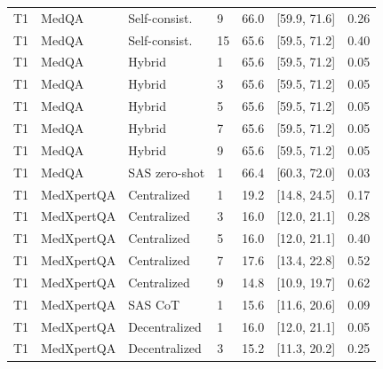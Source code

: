 \begin{table}[t]
\begin{tabular}{@{}llllrrr@{}}
T1 & MedQA & Self-consist. & 9 & 66.0 & [59.9, 71.6] & 0.26 \\
T1 & MedQA & Self-consist. & 15 & 65.6 & [59.5, 71.2] & 0.40 \\
T1 & MedQA & Hybrid & 1 & 65.6 & [59.5, 71.2] & 0.05 \\
T1 & MedQA & Hybrid & 3 & 65.6 & [59.5, 71.2] & 0.05 \\
T1 & MedQA & Hybrid & 5 & 65.6 & [59.5, 71.2] & 0.05 \\
T1 & MedQA & Hybrid & 7 & 65.6 & [59.5, 71.2] & 0.05 \\
T1 & MedQA & Hybrid & 9 & 65.6 & [59.5, 71.2] & 0.05 \\
T1 & MedQA & SAS zero-shot & 1 & 66.4 & [60.3, 72.0] & 0.03 \\
T1 & MedXpertQA & Centralized & 1 & 19.2 & [14.8, 24.5] & 0.17 \\
T1 & MedXpertQA & Centralized & 3 & 16.0 & [12.0, 21.1] & 0.28 \\
T1 & MedXpertQA & Centralized & 5 & 16.0 & [12.0, 21.1] & 0.40 \\
T1 & MedXpertQA & Centralized & 7 & 17.6 & [13.4, 22.8] & 0.52 \\
T1 & MedXpertQA & Centralized & 9 & 14.8 & [10.9, 19.7] & 0.62 \\
T1 & MedXpertQA & SAS CoT & 1 & 15.6 & [11.6, 20.6] & 0.09 \\
T1 & MedXpertQA & Decentralized & 1 & 16.0 & [12.0, 21.1] & 0.05 \\
T1 & MedXpertQA & Decentralized & 3 & 15.2 & [11.3, 20.2] & 0.25 \\
\bottomrule
\end{tabular}
\end{table}

